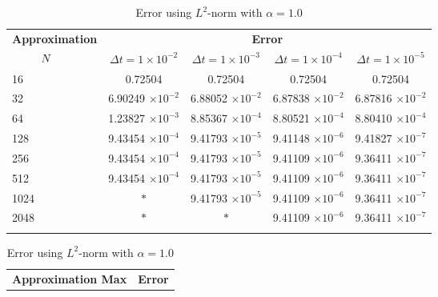 	\begin{table}[H]
		\begin{tabular}{lcccc}
			\toprule
			\multicolumn{1}{c}{\textbf{Approximation}} & \multicolumn{4}{c}{\textbf{Error}} \\
			$\hspace{9mm}N$ & $\Delta t=1\times 10^{-2}$ & $\Delta t=1\times 10^{-3}$ & $\Delta t=1\times 10^{-4}$ & $\Delta t=1\times 10^{-5}$ \\
			\midrule
			\hspace{7mm} 16 & 0.72504    & 0.72504    & 0.72504    & 0.72504    \\
			\midrule
			\hspace{7mm} 32 & 6.90249 $\times 10 ^{-2}$   & 6.88052 $\times 10 ^{-2}$   & 6.87838 $\times 10 ^{-2}$   & 6.87816 $\times 10 ^{-2}$   \\
			\midrule
			\hspace{7mm} 64 & 1.23827 $\times 10 ^{-3}$  & 8.85367 $\times 10 ^{-4}$ & 8.80521 $\times 10 ^{-4}$ & 8.80410 $\times 10 ^{-4}$  \\
			\midrule
			\hspace{7mm} 128 & 9.43454 $\times 10 ^{-4}$ & 9.41793 $\times 10 ^{-5}$ & 9.41148 $\times 10 ^{-6}$ & 9.41827 $\times 10 ^{-7}$  \\
			\midrule
			\hspace{7mm} 256 & 9.43454 $\times 10 ^{-4}$ & 9.41793 $\times 10 ^{-5}$ & 9.41109 $\times 10 ^{-6}$ & 9.36411 $\times 10 ^{-7}$ \\
			\midrule
			\hspace{7mm} 512 & 9.43454 $\times 10 ^{-4}$ & 9.41793 $\times 10 ^{-5}$ & 9.41109 $\times 10 ^{-6}$ & 9.36411 $\times 10 ^{-7}$ \\
			\midrule
			\hspace{7mm} 1024 & $\ast$ & 9.41793 $\times 10^{-5}$ & 9.41109 $\times 10^{-6}$ & 9.36411 $\times 10^{-7}$              \\
			\midrule
			\hspace{7mm} 2048 & $\ast$ & $\ast$ & 9.41109 $\times 10^{-6}$ & 9.36411 $\times 10^{-7}$   \\
			\\
			\bottomrule
		\end{tabular}
		\caption{Error using $L^2$-norm with $\alpha = 1.0$}
		\label{Galerkin_tabla_L2_alpha=1}
		\vspace{1cm}
		\begin{tabular}{lcccc}
			\toprule
			\multicolumn{1}{c}{\textbf{Approximation Max}} & \multicolumn{4}{c}{\textbf{Error}} \\

\end{tabular}
\end{table}
